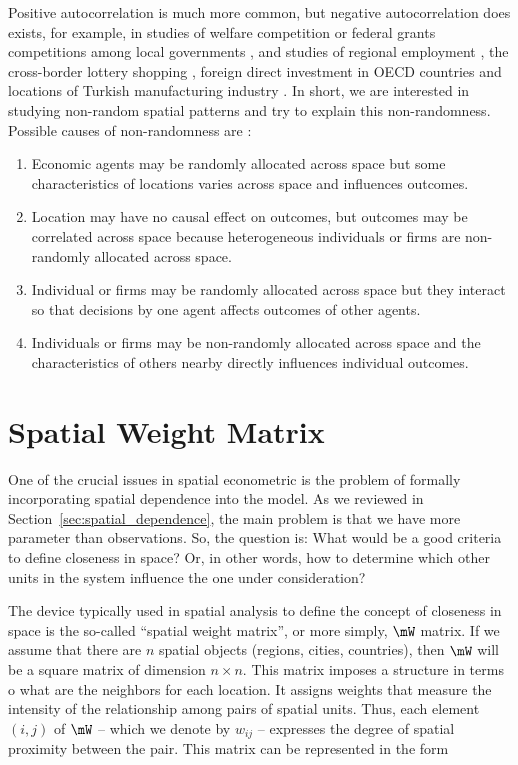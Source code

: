 \documentclass[english,12pt]{book}\usepackage[]{graphicx}\usepackage[]{xcolor}
\begin{document}
  	
Positive autocorrelation is much more common, but negative autocorrelation does exists, for example, in studies of welfare competition or federal grants competitions among local governments \citep{saavedra2000model, boarnet2002federal}, and studies of regional employment \citep{filiztekin2009regional, pavlyuk2011spatial}, the cross-border lottery shopping \citep{garrett2002revenue}, foreign direct investment in OECD countries \citep{garretsen2009fdi} and locations of Turkish manufacturing industry \citep{basdas2009spatial}. In short, we are interested in studying non-random spatial patterns and try to explain this non-randomness. Possible causes of non-randomness are \citep{gibbons2015spatial}:

\begin{enumerate}
	\item Economic agents may be randomly allocated across space but some characteristics of locations varies across space and influences outcomes. 
	\item Location may have no causal effect on outcomes, but outcomes may be correlated across space because heterogeneous individuals or firms are non-randomly allocated across space. 
	\item Individual or firms may be randomly allocated across  space but they interact so that decisions by one agent affects outcomes of other agents. 
	\item Individuals or firms may be non-randomly allocated across space and the characteristics of others nearby directly influences individual outcomes. 
\end{enumerate}


\section{Spatial Weight Matrix}

One of the crucial issues in spatial econometric is the problem of formally incorporating spatial dependence into the model. As we reviewed in Section~\ref{sec:spatial_dependence}, the main problem is that we have more parameter than observations. So, the question is: What would be a good criteria to define closeness in space? Or, in other words, how to determine which other units in the system influence the one under consideration?

The device typically used in spatial analysis to define the concept of closeness in space is the so-called ``spatial weight matrix'', or more simply, $\mW$ matrix. If we assume that there are $n$ spatial objects (regions, cities, countries), then $\mW$ will be a square matrix of dimension $n \times n$. This matrix imposes a structure in terms o what are the neighbors for each location. It assigns weights that measure the intensity of the relationship among pairs of spatial units. Thus, each element $(i,j)$ of $\mW$ -- which we denote by $w_{ij}$ -- expresses the degree of spatial proximity between the pair. This matrix can be represented in the form
\end{document}
